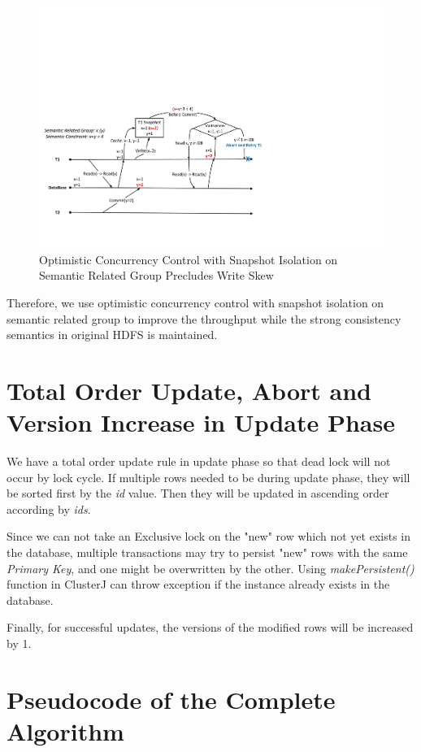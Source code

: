 \begin{figure}[h]
	\centering
	\includegraphics[width=\linewidth]{figs/snapwriteskew.pdf}
	\caption{Optimistic Concurrency Control with Snapshot Isolation on Semantic Related Group Precludes Write Skew}
	\label{fig:snapwriteskew}
\end{figure}

\noindent Therefore, we use optimistic concurrency control with snapshot isolation on semantic related group to improve the throughput while the strong consistency semantics in original HDFS is maintained.

\section{Total Order Update, Abort and Version Increase in Update Phase}
We have a total order update rule in update phase so that dead lock will not occur by lock cycle. If multiple rows needed to be during update phase, they will be sorted first by the \textit{id} value. Then they will be updated in ascending order according by \textit{ids}. 

\noindent Since we can not take an Exclusive lock on the "new" row which not yet exists in the database, multiple transactions may try to persist "new" rows with the same \textit{Primary Key}, and one might be overwritten by the other. Using \textit{makePersistent()} function in ClusterJ can throw exception if the instance already exists in the database.

\noindent Finally, for successful updates, the versions of the modified rows will be increased by 1.

\section{Pseudocode of the Complete Algorithm}

